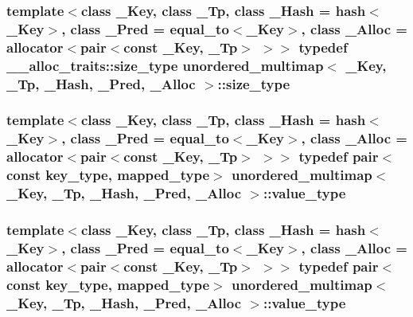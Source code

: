 \subsubsection[{size\+\_\+type}]{\setlength{\rightskip}{0pt plus 5cm}template$<$class \+\_\+\+Key, class \+\_\+\+Tp, class \+\_\+\+Hash = hash$<$\+\_\+\+Key$>$, class \+\_\+\+Pred = equal\+\_\+to$<$\+\_\+\+Key$>$, class \+\_\+\+Alloc = allocator$<$pair$<$const \+\_\+\+Key, \+\_\+\+Tp$>$ $>$$>$ typedef \+\_\+\+\_\+alloc\+\_\+traits\+::size\+\_\+type {\bf unordered\+\_\+multimap}$<$ \+\_\+\+Key, \+\_\+\+Tp, \+\_\+\+Hash, \+\_\+\+Pred, \+\_\+\+Alloc $>$\+::{\bf size\+\_\+type}}\label{classunordered__multimap_a977c4093df6d4d0302f280de19af4b58}
\hypertarget{classunordered__multimap_a106d390dc0deafc47f10d3943b247ee6}{}
\subsubsection[{value\+\_\+type}]{\setlength{\rightskip}{0pt plus 5cm}template$<$class \+\_\+\+Key, class \+\_\+\+Tp, class \+\_\+\+Hash = hash$<$\+\_\+\+Key$>$, class \+\_\+\+Pred = equal\+\_\+to$<$\+\_\+\+Key$>$, class \+\_\+\+Alloc = allocator$<$pair$<$const \+\_\+\+Key, \+\_\+\+Tp$>$ $>$$>$ typedef pair$<$const {\bf key\+\_\+type}, {\bf mapped\+\_\+type}$>$ {\bf unordered\+\_\+multimap}$<$ \+\_\+\+Key, \+\_\+\+Tp, \+\_\+\+Hash, \+\_\+\+Pred, \+\_\+\+Alloc $>$\+::{\bf value\+\_\+type}}\label{classunordered__multimap_a106d390dc0deafc47f10d3943b247ee6}
\hypertarget{classunordered__multimap_a106d390dc0deafc47f10d3943b247ee6}{}
\subsubsection[{value\+\_\+type}]{\setlength{\rightskip}{0pt plus 5cm}template$<$class \+\_\+\+Key, class \+\_\+\+Tp, class \+\_\+\+Hash = hash$<$\+\_\+\+Key$>$, class \+\_\+\+Pred = equal\+\_\+to$<$\+\_\+\+Key$>$, class \+\_\+\+Alloc = allocator$<$pair$<$const \+\_\+\+Key, \+\_\+\+Tp$>$ $>$$>$ typedef pair$<$const {\bf key\+\_\+type}, {\bf mapped\+\_\+type}$>$ {\bf unordered\+\_\+multimap}$<$ \+\_\+\+Key, \+\_\+\+Tp, \+\_\+\+Hash, \+\_\+\+Pred, \+\_\+\+Alloc $>$\+::{\bf value\+\_\+type}}\label{classunordered__multimap_a106d390dc0deafc47f10d3943b247ee6}


